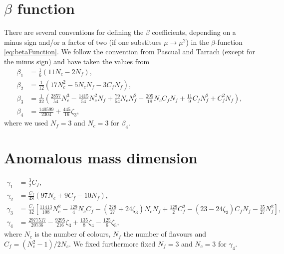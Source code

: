 \documentclass[../../index.tex]{subfiles}
\begin{document}
  \section{$\beta$ function}
  \label{sec:betaCoefficients}
  There are several conventions for defining the $\beta$ coefficients, depending
  on a minus sign and/or a factor of two (if one substitues $\mu \to \mu^2$) in
  the $\beta$-function \ref{eq:betaFunction}. We follow the convention from
  Pascual and Tarrach (except for the minus sign) and have taken the values from
  \cite{Boito2011}
  \begin{align}
    \beta_1 &= \frac{1}{6} (11N_c - 2N_f), \\
    \beta_2 &= \frac{1}{12} (17N_c^2 - 5N_cN_f - 3 C_fN_f), \\
    \beta_3 &= \frac{1}{32}\left( \frac{2857}{54}N_c^3 -\frac{1415}{54}N_c^2 N_f + \frac{79}{54} N_c N_f^2 - \frac{205}{18} N_c C_f N_f + \frac{11}{9} C_f N_f^2 + C_f^2 N_f \right), \\
    \beta_4 &= \frac{140599}{2304} + \frac{445}{16}\zeta_3,
  \end{align}
  where we used $N_f=3$ and $N_c=3$ for $\beta_4$.

  \section{Anomalous mass dimension}
  \label{app:gammaCoefficients}
  \begin{align}
    \gamma_1 &= \frac{3}{2}C_f, \\
    \gamma_2 &= \frac{C_f}{48}(97 N_c + 9 C_f - 10N_f), \\
    \gamma_3 &= \frac{C_f}{32}\left[ \frac{11413}{108} N_c^2 - \frac{129}{4} N_cC_f - \left( \frac{278}{27} + 24 \zeta_3 \right) N_c N_f + \frac{129}{2} C_f^2 - (23 - 24 \zeta_3) C_f N_f - \frac{35}{27} N_f^2 \right], \\
    \gamma_4 &= \frac{2977517}{20736} - \frac{9295}{216}\zeta_3 + \frac{135}{8}\zeta_4 - \frac{125}{6}\zeta_5,
  \end{align}
  where $N_c$ is the number of colours, $N_f$ the number of flavours and
  $C_f=(N_c^2-1)/2N_c$. We fixed furthermore fixed
  $N_f=3$ and $N_c=3$ for $\gamma_4$.
\end{document}
